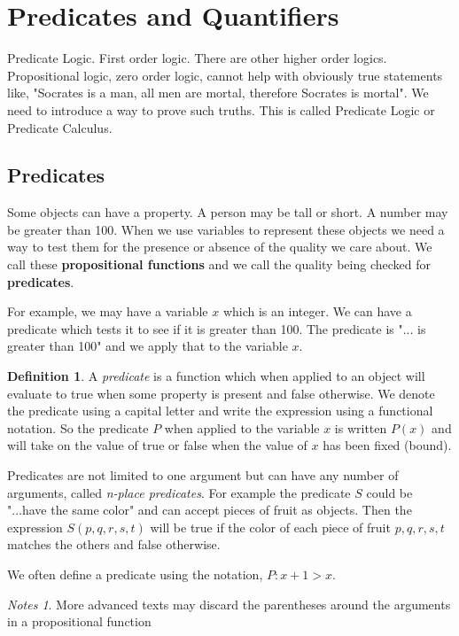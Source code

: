 \documentclass[11pt]{book} %
\theoremstyle {definition}
\newtheorem {definition}{Definition}[section]
\theoremstyle {remark}
\newtheorem*{notes}{Notes}
\begin{document}
\section {Predicates and Quantifiers}
Predicate Logic. First order logic. There are other higher order logics. 
Propositional logic, zero order logic, cannot help with obviously true statements like, "Socrates is a man, all men are mortal, therefore Socrates is mortal". We need to introduce a way to prove such truths. This is called Predicate Logic or Predicate Calculus.

    \subsection {Predicates}
Some objects can have a property. A person may be tall or short. A number may be greater than 100. When we use variables to represent these objects we need a way to test them for the presence or absence of the quality we care about. We call these \textbf{propositional functions} and we call the quality being checked for \textbf{predicates}. 

For example, we may have a variable $x$ which is an integer. We can have a predicate which tests it to see if it is greater than 100. The predicate is "... is greater than 100" and we apply that to the variable $x$.

\begin{definition}
A \textit{predicate} is a function which when applied to an object will evaluate to true when some property is present and false otherwise. We denote the predicate using a capital letter and write the expression using a functional notation. So the predicate $P$ when applied to the variable $x$ is written $P(x)$ and will take on the value of true or false when the value of $x$ has been fixed (bound).

Predicates are not limited to one argument but can have any number of arguments, called \textit{n-place predicates}. For example the predicate $S$ could be "...have the same color" and can accept pieces of fruit as objects. Then the expression $S(p,q,r,s,t)$ will be true if the color of each piece of fruit $p,q,r,s,t$ matches the others and false otherwise.

We often define a predicate using the notation, $P: x+1 > x$.
\end{definition}

\begin{notes}
More advanced texts may discard the parentheses around the arguments in a propositional function
\end{notes}
\end{document}
